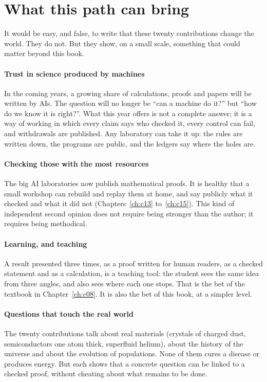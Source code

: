 \section{What this path can bring}

It would be easy, and false, to write that these twenty contributions change the world. They do not. But they show,
on a small scale, something that could matter beyond this book.

\paragraph{Trust in science produced by machines} In the coming years, a growing share of calculations, proofs and
papers will be written by AIs. The question will no longer be ``can a machine do it?'' but ``how do we know it is
right?''. What this year offers is not a complete answer; it is a way of working in which every claim says who checked
it, every control can fail, and withdrawals are published. Any laboratory can take it up: the rules are written down,
the programs are public, and the ledgers say where the holes are.

\paragraph{Checking those with the most resources} The big AI laboratories now publish mathematical proofs. It is
healthy that a small workshop can rebuild and replay them at home, and say publicly what it checked and what it did
not (Chapters~\ref{ch:c13} to~\ref{ch:c15}). This kind of independent second opinion does not require being stronger
than the author; it requires being methodical.

\paragraph{Learning, and teaching} A result presented three times, as a proof written for human readers, as a checked statement and as a
calculation, is a teaching tool: the student sees the same idea from three angles, and also sees where each one stops.
That is the bet of the textbook in Chapter~\ref{ch:c08}. It is also the bet of this book, at a simpler level.

\paragraph{Questions that touch the real world} The twenty contributions talk about real materials (crystals of charged
dust, semiconductors one atom thick, superfluid helium), about the history of the universe and about the evolution of
populations. None of them cures a disease or produces energy. But each shows that a concrete question can be linked to
a checked proof, without cheating about what remains to be done.

